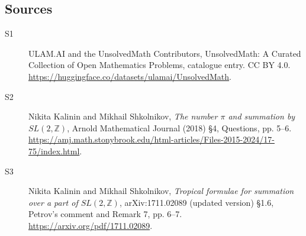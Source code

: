 \documentclass[11pt]{article}
\begin{document}
\subsection{Sources}
\begin{description}
\item[\hypertarget{source:statement:1}{S1}] ULAM.AI and the UnsolvedMath Contributors, UnsolvedMath: A Curated Collection of Open Mathematics Problems, catalogue entry. CC BY 4.0. \url{https://huggingface.co/datasets/ulamai/UnsolvedMath}.
\item[\hypertarget{source:statement:2}{S2}] Nikita Kalinin and Mikhail Shkolnikov, \emph{The number $\pi$ and summation by $SL(2,\mathbb Z)$}, Arnold Mathematical Journal (2018) \S4, Questions, pp. 5--6. \url{https://amj.math.stonybrook.edu/html-articles/Files-2015-2024/17-75/index.html}.
\item[\hypertarget{source:statement:3}{S3}] Nikita Kalinin and Mikhail Shkolnikov, \emph{Tropical formulae for summation over a part of $SL(2,\mathbb Z)$}, arXiv:1711.02089 (updated version) \S1.6, Petrov's comment and Remark 7, pp. 6--7. \url{https://arxiv.org/pdf/1711.02089}.
\end{description}
\label{end:statement}
\end{document}
